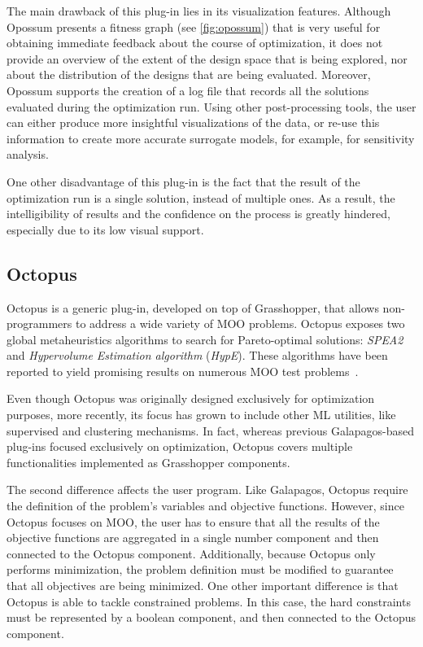 	The main drawback of this plug-in lies in its visualization features. Although Opossum presents a fitness graph (see \cref{fig:opossum}) that is very useful for obtaining immediate feedback about the course of optimization, it does not provide an overview of the extent of the design space that is being explored, nor about the distribution of the designs that are being evaluated. Moreover, Opossum supports the creation of a log file that records all the solutions evaluated during the optimization run. Using other post-processing tools, the user can either produce more insightful visualizations of the data, or re-use this information to create more accurate surrogate models, for example, for sensitivity analysis.
	
	One other disadvantage of this plug-in is the fact that the result of the optimization run is a single solution, instead of multiple ones. As a result, the intelligibility of results and the confidence on the process is greatly hindered, especially due to its low visual support. 
	
	\subsection{Octopus}
	
	Octopus is a generic plug-in, developed on top of Grasshopper, that allows non-programmers to address a wide variety of \ac{MOO} problems. Octopus exposes two global metaheuristics algorithms to search for Pareto-optimal solutions: \textit{\ac{SPEA2}} and \textit{Hypervolume Estimation algorithm} (\textit{HypE}). These algorithms have been reported to yield promising results on numerous \ac{MOO} test problems~\cite{Zitzler2001SPEA2,Zitzler2011HypE}. 
	
	Even though Octopus was originally designed exclusively for optimization purposes, more recently, its focus has grown to include other \ac{ML} utilities, like supervised and clustering mechanisms. In fact, whereas previous Galapagos-based plug-ins focused exclusively on optimization, Octopus covers multiple functionalities implemented as Grasshopper components.
	
	The second difference affects the user program. Like Galapagos, Octopus require the definition of the problem's variables and objective functions. However, since Octopus focuses on \ac{MOO}, the user has to ensure that all the results of the objective functions are aggregated in a single number component and then connected to the Octopus component. Additionally, because Octopus only performs minimization, the problem definition must be modified to guarantee that all objectives are being minimized. One other important difference is that Octopus is able to tackle constrained problems. In this case, the hard constraints must be represented by a boolean component, and then connected to the Octopus component.
	
